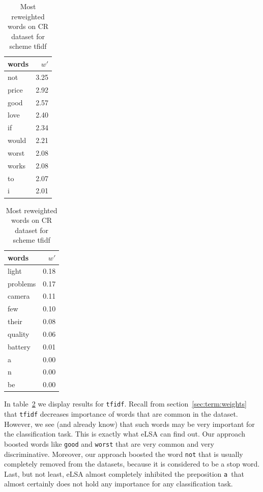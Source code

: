     
\begin{table}[h]
    \centering
    \begin{minipage}{.4\linewidth}
      \centering
        \begin{tabular}{lr}
\toprule
 words &  $w'$ \\
\midrule
   not &  3.25 \\
 price &  2.92 \\
  good &  2.57 \\
  love &  2.40 \\
    if &  2.34 \\
 would &  2.21 \\
 worst &  2.08 \\
 works &  2.08 \\
    to &  2.07 \\
     i &  2.01 \\
\bottomrule
\end{tabular}

    \end{minipage}
    \begin{minipage}{.4\linewidth}
      \centering
        \begin{tabular}{lr}
\toprule
    words &  $w'$ \\
\midrule
    light &  0.18 \\
 problems &  0.17 \\
   camera &  0.11 \\
      few &  0.10 \\
    their &  0.08 \\
  quality &  0.06 \\
  battery &  0.01 \\
        a &  0.00 \\
        n &  0.00 \\
       be &  0.00 \\
\bottomrule
\end{tabular}
    \end{minipage} 
    \caption{Most reweighted words on CR dataset for scheme tfidf}
    \label{tab:words:CR:tfidf}
\end{table}

    In table~\ref{tab:words:CR:tfidf} we display results for \texttt{tfidf}. 
    Recall from section~\ref{sec:term:weights} that \texttt{tfidf} decreases importance of words that are common in the dataset.
    However, we see (and already know) that such words may be very important for the classification task.
    This is exactly what eLSA can find out. 
    Our approach boosted words like \texttt{good} and \texttt{worst} that are very common and very discriminative.
    Moreover, our approach boosted the word \texttt{not} that is usually completely removed from the datasets, because it is considered to be a stop word. 
    Last, but not least, eLSA almost completely inhibited the preposition \texttt{a}~that almost certainly does not hold any importance for any classification task.


